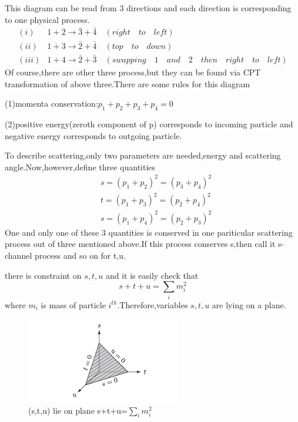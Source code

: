 \documentclass[a4paper]{article}
\begin{document}
This diagram can be read from 3 directions and each direction is corresponding to one physical process.
\begin{align*}
	(i)&1+2\rightarrow\bar{3}+\bar{4}\quad(right\quad to\quad left)\\
	(ii)&1+3\rightarrow\bar{2}+\bar{4}\quad(top\quad to\quad down)\\
	(iii)&1+4\rightarrow\bar{2}+\bar{3}\quad(swapping\quad1\quad and\quad2\quad then\quad right\quad to\quad left)
\end{align*}
Of course,there are other three process,but they can be found via CPT transformation of above three.There are some rules for this diagram
\par (1)momenta conservation:$p_1+p_2+p_3+p_4=0$
\par (2)positive energy(zeroth component of p) corresponds to incoming particle and negative energy corresponds to outgoing particle.
\par To describe scattering,only two parameters are needed,energy and scattering angle.Now,however,define three quantities
\begin{align*}
	&s=(p_1+p_2)^2=(p_3+p_4)^2\\
	&t=(p_1+p_3)^2=(p_2+p_4)^2\\
	&s=(p_1+p_4)^2=(p_2+p_3)^2
\end{align*}
One and only one of these 3 quantities is conserved in one pariticular scattering process out of three mentioned above.If this process conserves s,then call it s-channel process and so on for t,u.
\par there is constraint on $s,t,u$ and it is easily check that$$s+t+u=\sum_im_i^2$$where $m_i$ is mass of particle $i^{th}$.Therefore,variables $s,t,u$ are lying on a plane.
\begin{figure}[htbp]
	\centering
	\includegraphics[width=0.6\textwidth]{12.png}
	\caption{(s,t,u) lie on plane s+t+u=$\sum_im_i^2$}
\end{figure}
\end{document}
